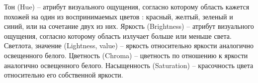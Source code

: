 \begin{figure}[ht!]
\end{figure}

Тон (Hue) -- атрибут визуального ощущения, согласно которому область кажется похожей на один из воспринимаемых цветов : красный, желтый, зеленый и синий, или на сочетание двух из них.
Яркость (Brightness) -- атрибут визуального ощущения, согласно которому область излучает больше или меньше света.
Светлота, значение (Lightness, value) -- яркость относительно яркости аналогично освещенного белого.
Цветность (Chroma) -- цветность по отношению к яркости аналогично освещенного белого.
Насыщенность (Saturation) -- красочность цвета относительно его собственной яркости.


\begin{figure}[ht!]
\end{figure}

